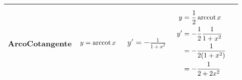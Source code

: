 \documentclass[../../main]{subfiles}
\begin{document}
\begin{center}
{\begin{tabular}{ |p{7em}|p{5em}|p{5em}|p{7em}|p{5cm}| }
            \begin{center}
                ArcoCotangente
            \end{center} &
            \begin{align}
                y=\operatorname{arccot}{x} \nonumber
            \end{align}  &
            \begin{align}
                y'= -\frac{1}{1+x^2} \nonumber
            \end{align} &
            {
                \begin{align}
                   y &= \frac{1}{2}\operatorname{arccot}{x} \nonumber \\
                   y' &= -\frac{1}{2} \frac{1}{1+x^2} \nonumber \\
                      &= -\frac{1}{2(1+x^2)} \nonumber \\
                      &= -\frac{1}{2+2x^2} \nonumber
                \end{align}
            } &
            {
            \begin{center}
            \end{center}
            } \\

            \hline
            
            
        \end{tabular}
    }
\end{center}
    
\end{document}
